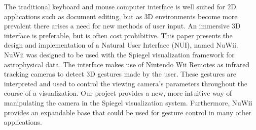 \fontsize{9}{11}\selectfont The traditional keyboard and mouse computer
interface is well suited for 2D applications such as document editing, but as 3D
environments become more prevalent there arises a need for new methods of user
input. An immersive 3D interface is preferable, but is often cost prohibitive.
This paper presents the design and implementation of a Natural User Interface
(NUI), named NuWii. NuWii was designed to be used with the Spiegel visualization
framework for astrophysical data. The interface makes use of Nintendo Wii
Remotes as infrared tracking cameras to detect 3D gestures made by the user.
These gestures are interpreted and used to control the viewing camera's
parameters throughout the course of a visualization. Our project provides a new,
more intuitive way of manipulating the camera in the Spiegel visualization
system. Furthermore, NuWii provides an expandable base that could be used for
gesture control in many other applications.  
